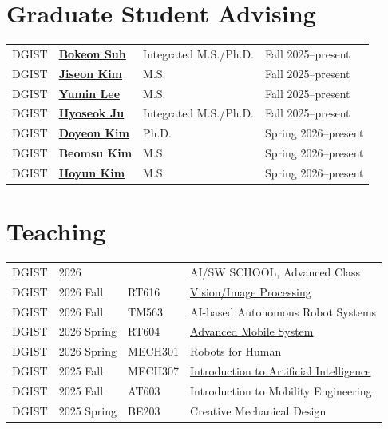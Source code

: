 \documentclass[10pt,a4paper]{article}
\newcommand{\talkbadge}[1]{%
  {\setlength{\fboxsep}{2pt}\sffamily\scriptsize
  \ifstrequal{#1}{International}{\colorbox{internationalbg}{\textcolor{internationaltext}{#1}}}{%
    \ifstrequal{#1}{DGIST}{\colorbox{internationalbg}{\textcolor{internationaltext}{#1}}}{\colorbox{domesticbg}{#1}}}}%
}
\newcommand{\teachrow}[4]{\talkbadge{#1} & #2 & #3 & #4 \\[1pt]}
\begin{document}
\section{Graduate Student Advising}
\begin{tabularx}{\textwidth}{@{}L{12mm}L{34mm}L{40mm}Y@{}}
\talkbadge{DGIST} & \textbf{\href{https://scholar.google.com/citations?user=ZawXymQAAAAJ\&hl=en}{Bokeon Suh}} & Integrated M.S./Ph.D. & Fall 2025--present \\[2pt]
\talkbadge{DGIST} & \textbf{\href{https://scholar.google.com/citations?user=KK3SC5sAAAAJ\&hl=en}{Jiseon Kim}} & M.S. & Fall 2025--present \\[2pt]
\talkbadge{DGIST} & \textbf{\href{https://scholar.google.com/citations?user=ekS5bSIAAAAJ\&hl=en}{Yumin Lee}} & M.S. & Fall 2025--present \\[2pt]
\talkbadge{DGIST} & \textbf{\href{https://scholar.google.com/citations?hl=en\&user=aYXHS9oAAAAJ\&view_op=list_works}{Hyoseok Ju}} & Integrated M.S./Ph.D. & Fall 2025--present \\[2pt]
\talkbadge{DGIST} & \textbf{\href{https://scholar.google.com/citations?user=W9zGnr0AAAAJ\&hl=en}{Doyeon Kim}} & Ph.D. & Spring 2026--present \\[2pt]
\talkbadge{DGIST} & \textbf{Beomsu Kim} & M.S. & Spring 2026--present \\[2pt]
\talkbadge{DGIST} & \textbf{\href{https://scholar.google.com/citations?hl=ko\&user=xyJ_O5AAAAAJ}{Hoyun Kim}} & M.S. & Spring 2026--present \\[2pt]
\end{tabularx}

\section{Teaching}
\begin{tabularx}{\textwidth}{@{}L{12mm}L{26mm}L{20mm}Y@{}}
\teachrow{DGIST}{2026}{}{AI/SW SCHOOL, Advanced Class}
\teachrow{DGIST}{2026 Fall}{RT616}{\href{https://github.com/team-aprl/lecture-RT616-public}{Vision/Image Processing}}
\teachrow{DGIST}{2026 Fall}{TM563}{AI-based Autonomous Robot Systems}
\teachrow{DGIST}{2026 Spring}{RT604}{\href{https://github.com/team-aprl/lecture-RT604-public}{Advanced Mobile System}}
\teachrow{DGIST}{2026 Spring}{MECH301}{Robots for Human}
\teachrow{DGIST}{2025 Fall}{MECH307}{\href{https://github.com/team-aprl/lecture-MECH307-public/tree/main}{Introduction to Artificial Intelligence}}
\teachrow{DGIST}{2025 Fall}{AT603}{Introduction to Mobility Engineering}
\teachrow{DGIST}{2025 Spring}{BE203}{Creative Mechanical Design}
\end{tabularx}
\end{document}
